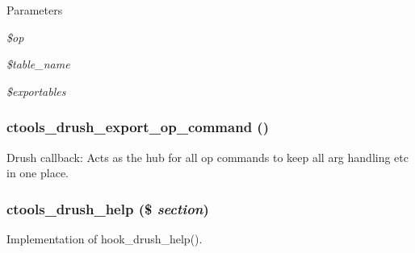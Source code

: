 \begin{DoxyParams}{Parameters}
\item[{\em \$op}]\item[{\em \$table\_\-name}]\item[{\em \$exportables}]\end{DoxyParams}
\hypertarget{ctools_8drush_8inc_a88b3f720a5f716558866a2e26fe24dc9}{
\subsubsection[{ctools\_\-drush\_\-export\_\-op\_\-command}]{\setlength{\rightskip}{0pt plus 5cm}ctools\_\-drush\_\-export\_\-op\_\-command ()}}
\label{ctools_8drush_8inc_a88b3f720a5f716558866a2e26fe24dc9}
Drush callback: Acts as the hub for all op commands to keep all arg handling etc in one place. \hypertarget{ctools_8drush_8inc_a447a62ee2e68fc6c9d52398963fe09be}{
\subsubsection[{ctools\_\-drush\_\-help}]{\setlength{\rightskip}{0pt plus 5cm}ctools\_\-drush\_\-help (\$ {\em section})}}
\label{ctools_8drush_8inc_a447a62ee2e68fc6c9d52398963fe09be}
Implementation of hook\_\-drush\_\-help(). 
